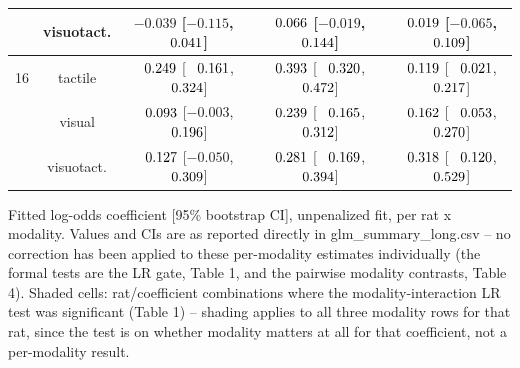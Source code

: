 \begin{longtable}{lcccc}
 & visuotact. & $-0.039$ [$-0.115$, $\hphantom{-}0.041$] & \cellcolor{gray!15}$\hphantom{-}0.066$ [$-0.019$, $\hphantom{-}0.144$] & \cellcolor{gray!15}$\hphantom{-}0.019$ [$-0.065$, $\hphantom{-}0.109$] \\
\midrule
16 & tactile & \cellcolor{gray!15}$\hphantom{-}0.249$ [$\hphantom{-}0.161$, $\hphantom{-}0.324$] & \cellcolor{gray!15}$\hphantom{-}0.393$ [$\hphantom{-}0.320$, $\hphantom{-}0.472$] & \cellcolor{gray!15}$\hphantom{-}0.119$ [$\hphantom{-}0.021$, $\hphantom{-}0.217$] \\
 & visual & \cellcolor{gray!15}$\hphantom{-}0.093$ [$-0.003$, $\hphantom{-}0.196$] & \cellcolor{gray!15}$\hphantom{-}0.239$ [$\hphantom{-}0.165$, $\hphantom{-}0.312$] & \cellcolor{gray!15}$\hphantom{-}0.162$ [$\hphantom{-}0.053$, $\hphantom{-}0.270$] \\
 & visuotact. & \cellcolor{gray!15}$\hphantom{-}0.127$ [$-0.050$, $\hphantom{-}0.309$] & \cellcolor{gray!15}$\hphantom{-}0.281$ [$\hphantom{-}0.169$, $\hphantom{-}0.394$] & \cellcolor{gray!15}$\hphantom{-}0.318$ [$\hphantom{-}0.120$, $\hphantom{-}0.529$] \\
\end{longtable}
\vspace{4pt}
\par\noindent
\begin{minipage}{\linewidth}\small Fitted log-odds coefficient [95\% bootstrap CI], unpenalized fit, per rat x modality. Values and CIs are as reported directly in glm\_summary\_long.csv -- no correction has been applied to these per-modality estimates individually (the formal tests are the LR gate, Table 1, and the pairwise modality contrasts, Table 4). Shaded cells: rat/coefficient combinations where the modality-interaction LR test was significant (Table 1) -- shading applies to all three modality rows for that rat, since the test is on whether modality matters at all for that coefficient, not a per-modality result. \end{minipage}